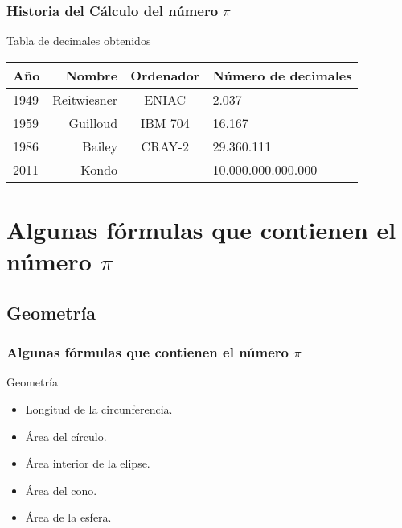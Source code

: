 \documentclass{beamer}
\begin{document}
\begin{frame}
\frametitle{Historia del Cálculo del número $\pi$}
\begin{block}{Tabla de decimales obtenidos}
\begin{table}{}
\begin{tabular}{lrcl}
Año   &  Nombre       &  Ordenador &  Número de decimales \\ \hline
1949  &  Reitwiesner  &  ENIAC     &  2.037  \\ \hline
1959  &  Guilloud     &  IBM 704   &  16.167  \\ \hline
1986  &  Bailey       &  CRAY-2    &  29.360.111 \\ \hline
2011  &  Kondo        &            &  10.000.000.000.000 \\ \hline
\end{tabular}
\end {table}
\end{block}
\end{frame}

\section{Algunas fórmulas que contienen el número $\pi$}
\subsection{Geometría} 

\begin{frame}
\frametitle{Algunas fórmulas que contienen el número $\pi$} 

\begin{block}{Geometría}

\begin{itemize}

  \item Longitud de la circunferencia.
  \pause
  \item Área del círculo.
  \pause
  \item Área interior de la elipse.
  \pause
  \item Área del cono.
  \pause
  \item Área de la esfera.

\end{itemize}
\end{block}

\end{frame}
\end{document}
